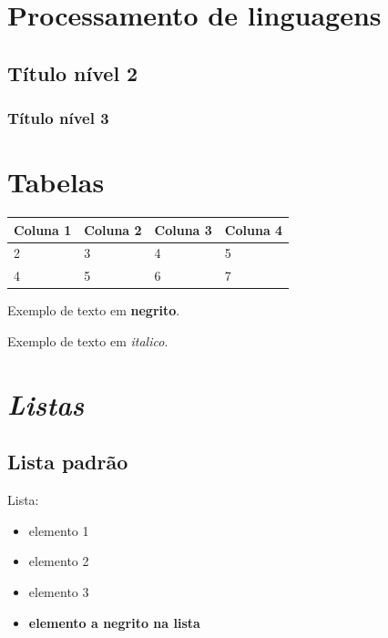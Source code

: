 \documentclass{article}
\begin{document}
\section{ Processamento de linguagens }

\subsection{ Título nível 2 }

\subsubsection{ Título nível 3 }


\section{ Tabelas }

\begin{table}[h]
\begin{tabular}{|l|l|l|l|}
\hline

Coluna 1  &  Coluna 2  &  Coluna 3  &  Coluna 4 \\ \hline
2  &  3  &  4  &  5 \\ \hline
4  &  5  &  6  &  7 \\ \hline


\end{tabular}
\end{table}


Exemplo de texto em \textbf{negrito}. 

Exemplo de texto em \textit{italico}.

\section{ \textit{ Listas } }

\subsection{ Lista padrão }
Lista:

\begin{itemize}
 
	
	\item  elemento 1
	
	\item  elemento 2
	
	\item  elemento 3
	
	\item  \textbf{ elemento a negrito na lista }

\end{itemize}
\end{document}
